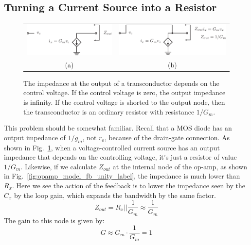 \subsection{Turning a Current Source into a Resistor}
\begin{figure}[tb]
\centering
\begin{tabular}{cc}
\includegraphics[width=.4\columnwidth]{tia_zout} &
\includegraphics[width=.4\columnwidth]{tia_zout_fb}\\
(a) & (b)\\
\end{tabular}
\caption{The impedance at the output of a transconductor depends on the control voltage. If the control voltage is zero, the output impedance is infinity.  If the control voltage is shorted to the output node, then the transconductor is an ordinary resistor with resistance $1/G_m$.}
\label{fig:tia_zout}
\end{figure}
This problem should be somewhat familiar.  Recall that a MOS diode has an output impedance of $1/g_m$, not $r_o$, because of the drain-gate connection.  As shown in Fig.~\ref{fig:tia_zout}, when a voltage-controlled current source has an output impedance that depends on the controlling voltage, it's just a resistor of value $1/G_m$.  Likewise, if we calculate $Z_{out}$ at the internal node of the op-amp, as shown in Fig.~\ref{fig:opamp_model_fb_unity_label}, the impedance is much lower than $R_x$.   Here we see the action of the feedback is to lower the impedance seen by the $C_x$ by the loop gain, which expands the bandwidth by the same factor.
    \begin{equation}
        Z_{out} = R_x || \frac{1}{G_m} \approx \frac{1}{G_m}
    \end{equation}
The gain to this node is given by:
    \begin{equation}
        G \approx G_m \cdot \frac{1}{G_m} = 1
    \end{equation}

